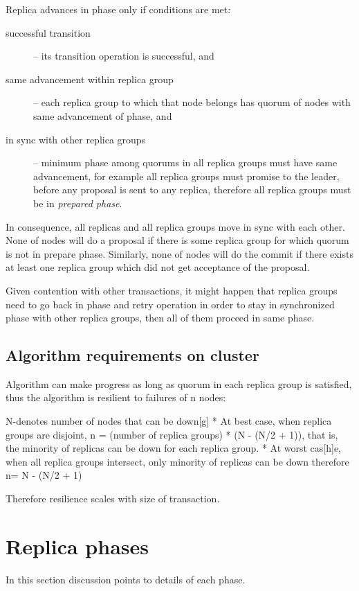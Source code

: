 Replica advances in phase only if conditions are met: \begin{description}
\item[successful transition] -- its transition operation is successful, and
\item[same advancement within replica group] -- each replica group to which that node belongs has quorum of nodes with same advancement of phase, and
\item[in sync with other replica groups] -- minimum phase among quorums in all replica groups must have same advancement, for example all replica groups must promise to the leader, before any proposal is sent to any replica, therefore all replica groups must be in \emph{prepared phase}.
\end{description}


In consequence, all replicas and all replica groups move in sync with each other. None of nodes will do a proposal if there is some replica group for which quorum is not in prepare phase. 
Similarly, none of nodes will do the commit if there exists at least one replica group which did not get acceptance of the proposal.  

Given contention with other transactions, it might happen that replica groups need to go back in phase and retry operation in order to stay in synchronized phase with other replica groups, then all of them proceed in same phase.


\subsection{Algorithm requirements on cluster}
Algorithm can make progress as long as quorum in each replica group is satisfied, thus the algorithm is resilient to failures of n nodes:


        N-denotes number of nodes that can be down[g]
* At best case, when replica groups are disjoint, n = (number of replica groups) * (N - (N/2 + 1)), that is, the minority of replicas can be down for each replica group.
* At worst cas[h]e, when all replica groups intersect, only minority of replicas can be down therefore n= N - (N/2 + 1)



Therefore resilience scales with size of transaction.


\section{Replica phases}
In this section discussion points to details of each phase.

